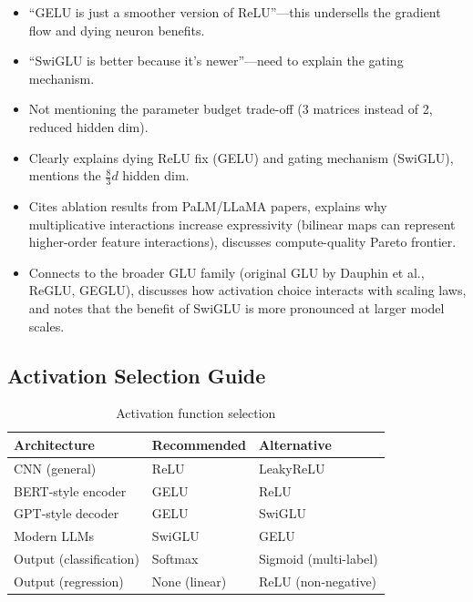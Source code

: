 \begin{interviewq}
\redflags
\begin{itemize}
    \item ``GELU is just a smoother version of ReLU''---this undersells the gradient flow and dying neuron benefits.
    \item ``SwiGLU is better because it's newer''---need to explain the gating mechanism.
    \item Not mentioning the parameter budget trade-off (3 matrices instead of 2, reduced hidden dim).
\end{itemize}


\goodgreat
\begin{itemize}
    \item {} Clearly explains dying ReLU fix (GELU) and gating mechanism (SwiGLU), mentions the $\frac{8}{3}d$ hidden dim.
    \item {} Cites ablation results from PaLM/LLaMA papers, explains why multiplicative interactions increase expressivity (bilinear maps can represent higher-order feature interactions), discusses compute-quality Pareto frontier.
    \item {} Connects to the broader GLU family (original GLU by Dauphin et al., ReGLU, GEGLU), discusses how activation choice interacts with scaling laws, and notes that the benefit of SwiGLU is more pronounced at larger model scales.
\end{itemize}

\end{interviewq}

\subsection{Activation Selection Guide}

\begin{table}[H]
\centering
\caption{Activation function selection}
\begin{tabularx}{\textwidth}{lXX}
\toprule
\textbf{Architecture} & \textbf{Recommended} & \textbf{Alternative} \\
\midrule
CNN (general) & ReLU & LeakyReLU \\
BERT-style encoder & GELU & ReLU \\
GPT-style decoder & GELU & SwiGLU \\
Modern LLMs & SwiGLU & GELU \\
Output (classification) & Softmax & Sigmoid (multi-label) \\
Output (regression) & None (linear) & ReLU (non-negative) \\
\bottomrule
\end{tabularx}
\end{table}

